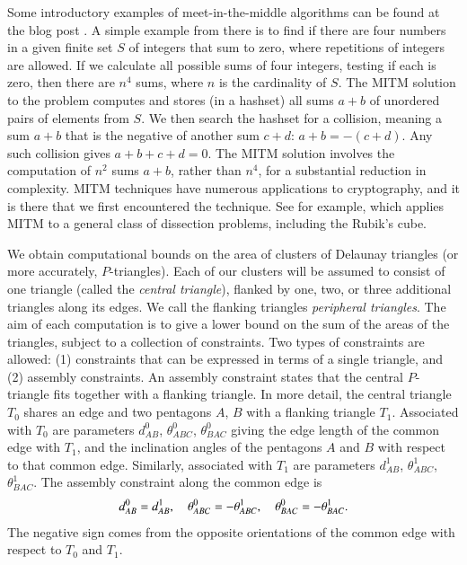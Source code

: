 Some introductory examples of meet-in-the-middle
algorithms can be found at the blog post \cite{mitm}.
A simple example from there is to find if there are four numbers in a
given finite set $S$ of integers that sum to zero, where repetitions
of integers are allowed.  If we calculate all possible sums of four
integers, testing if each is zero, then there are $n^4$ sums, where
$n$ is the cardinality of $S$.  The MITM solution to the problem
computes and stores (in a hashset) all sums $a+b$ of unordered pairs
of elements from $S$.  We then search the hashset for a collision,
meaning a sum $a+b$ that is the negative of another sum $c+d$: $a+b =
-(c+d)$.  Any such collision gives $a+b+c+d=0$.  The MITM solution
involves the computation of $n^2$ sums $a+b$, rather than $n^4$, for a
substantial reduction in complexity.  MITM techniques have numerous
applications to cryptography, and it is there that we first
encountered the technique.  See for example,
\cite{dinur2014dissection}
which applies MITM to a general class of dissection problems,
including the Rubik's cube.

We obtain computational bounds on the area of clusters of Delaunay
triangles (or more accurately, $P$-triangles).  Each of our clusters
will be assumed to consist of one triangle (called the {\it central
triangle}), flanked by one, two, or three additional triangles along
its edges.  We call the flanking triangles {\it peripheral triangles}.
The aim of each computation is to give a lower bound on the sum of the
areas of the triangles, subject to a collection of constraints.  Two
types of constraints are allowed: (1) constraints that can be
expressed in terms of a single triangle, and (2) assembly constraints.
An assembly constraint states that the central $P$-triangle fits
together with a flanking triangle.  In more detail, the central
triangle $T_0$ shares an edge and two pentagons $A$, $B$ with a
flanking triangle $T_1$.  Associated with $T_0$ are parameters
$d^0_{AB}$, $\theta^0_{ABC}$, $\theta^0_{BAC}$ giving the edge length
of the common edge with $T_1$, and the inclination angles of the
pentagons $A$ and $B$ with respect to that common edge.  Similarly,
associated with $T_1$ are parameters $d^1_{AB}$, $\theta^1_{ABC}$,
$\theta^1_{BAC}$.  The assembly constraint along the common edge is
\begin{equation}\libel{eqn:assembly}
d^0_{AB} = d^1_{AB},\quad 
\theta^0_{ABC} = -\theta^1_{ABC},\quad \theta^0_{BAC} = -\theta^1_{BAC}.
\end{equation}
The negative sign comes from the opposite orientations of the common
edge with respect to $T_0$ and $T_1$.

